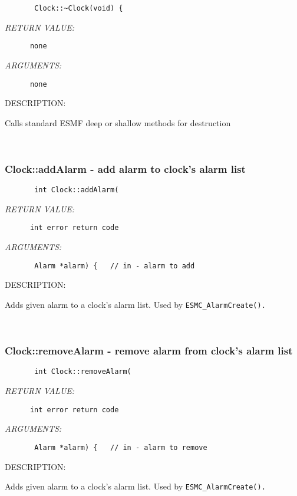   
\begin{verbatim}       Clock::~Clock(void) {\end{verbatim}{\em RETURN VALUE:}
\begin{verbatim}      none\end{verbatim}{\em ARGUMENTS:}
\begin{verbatim}      none\end{verbatim}
{\sf DESCRIPTION:\\ }


        Calls standard ESMF deep or shallow methods for destruction
   
 
\mbox{}\hrulefill\ 
 
\subsubsection [Clock::addAlarm] {Clock::addAlarm - add alarm to clock's alarm list}


  
\begin{verbatim}       int Clock::addAlarm(\end{verbatim}{\em RETURN VALUE:}
\begin{verbatim}      int error return code\end{verbatim}{\em ARGUMENTS:}
\begin{verbatim}       Alarm *alarm) {   // in - alarm to add\end{verbatim}
{\sf DESCRIPTION:\\ }


       Adds given alarm to a clock's alarm list. 
       Used by {\tt ESMC\_AlarmCreate().}
   
 
\mbox{}\hrulefill\ 
 
\subsubsection [Clock::removeAlarm] {Clock::removeAlarm - remove alarm from clock's alarm list}


  
\begin{verbatim}       int Clock::removeAlarm(\end{verbatim}{\em RETURN VALUE:}
\begin{verbatim}      int error return code\end{verbatim}{\em ARGUMENTS:}
\begin{verbatim}       Alarm *alarm) {   // in - alarm to remove\end{verbatim}
{\sf DESCRIPTION:\\ }


       Adds given alarm to a clock's alarm list. 
       Used by {\tt ESMC\_AlarmCreate().}
  
\setlength{\parskip}{\oldparskip}
\setlength{\parindent}{\oldparindent}
\setlength{\baselineskip}{\oldbaselineskip}
